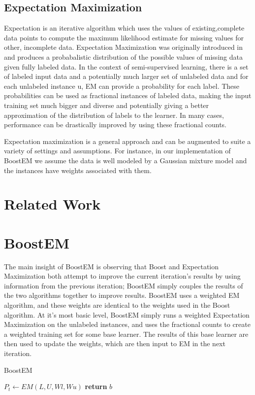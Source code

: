 \documentclass{sig-alternate}
\begin{document}
\subsection{Expectation Maximization}
Expectation is an iterative algorithm which uses the values of existing,complete data points to compute the maximum likelihood estimate for missing values for other, incomplete data. Expectation Maximization was originally introduced in ~\cite{Dempster77maximumlikelihood} and produces a probabalistic distribution of the possible values of missing data given fully labeled data. In the context of semi-supervised learning, there is a set of labeled input data and a potentially much larger set of unlabeled data and for each unlabeled instance u, EM can provide a probability for each label.  These probabilities can be used as fractional instances of labeled data, making the input training set much bigger and diverse and potentially giving a better approximation of the distribution of labels to the learner. In many cases, performance can be drastically improved by using these fractional counts.

Expectation maximization is a general approach and can be augmented to suite a variety of settings and assumptions.  For instance, in our implementation of BoostEM we assume the data is well modeled by a Gaussian mixture model and the instances have weights associated with them.    

     
\section{Related Work}
\section{BoostEM}
The main insight of BoostEM is observing that Boost and Expectation Maximization both attempt to improve the current iteration's results by using information from the previous iteration; BoostEM simply couples the results of the two algorithms together to improve results.  BoostEM uses a weighted EM algorithm, and these weights are identical to the weights used in the Boost algorithm.  At it's most basic level, BoostEM simply runs a weighted Expectation Maximization on the unlabeled instances, and uses the fractional counts to create a weighted training set for some base learner.  The results of this base learner are then used to update the weights, which are then input to EM in the next iteration.

\begin{algorithm}
\caption{BoostEM}\label{euclid}
\begin{algorithmic}[1]
\State $P_{t} \gets EM(L,U,Wl,Wu)$
\EndFor
\State \textbf{return} $b$
\EndProcedure
\end{algorithmic}
\end{algorithm}
\end{document}
